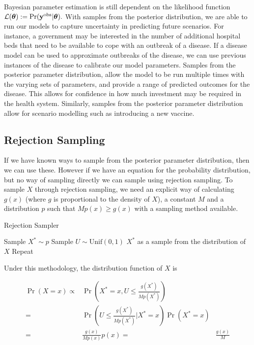 Bayesian parameter estimation is still dependent on the likelihood function
$\mathcal{L}(\bm{\theta}) := \Pr(\mathbf{y}^{\mathrm{obs}}|\bm{\theta}).$
With samples from the posterior distribution, we are
able to run our models to capture uncertainty in predicting future scenarios.
For instance, a government may be interested in the number of additional
hospital beds that need to be available to cope with an outbreak of a disease.
If a disease model can be used to approximate outbreaks of the disease,
we can use previous instances of the disease to calibrate our model parameters.
Samples from the posterior parameter distribution, allow
the model to be run multiple times with the varying sets of parameters,
and provide a range of predicted outcomes for the disease. This allows for
confidence in how much investment may be required in the health system.
Similarly, samples from the posterior parameter distribution allow for scenario
modelling such as introducing a new vaccine.

\subsection*{Rejection Sampling}

If we have known ways to sample from the posterior parameter distribution,
then we can use these. However if we have an equation for the probability
distribution, but no way of sampling directly we can sample using rejection
sampling. To sample $X$ through rejection sampling,
we need an explicit way of calculating
$g(x)$ (where $g$ is proportional to the density of $X$), a constant $M$ and
a distribution $p$ such that $Mp(x) \geq g(x)$ with a sampling method
available.

\begin{algorithm}[htbp]
    \caption{Rejection Sampler}
    \label{alg:rej_samp}
    \begin{algorithmic}
        \State Sample $X^\ast \sim p$
        \State Sample $U \sim \mathrm{Unif}(0, 1)$
        \State \Return $X^\ast$ as a sample from the distribution of $X$
        \Else
        \State Repeat
        \EndIf
    \end{algorithmic}
\end{algorithm}

Under this methodology, the distribution function of $X$ is

\begin{align*}
    \Pr(X = x)
    \propto & \Pr(X^\ast = x , U \leq \frac{g(X^\ast)}{M p(X^\ast)})
    \tag*{where the probabilities may be interpreted as densities}                   \\
    =       & \Pr(U \leq \frac{g(X^\ast)}{M p(X^\ast)} | X^\ast = x) \Pr(X^\ast = x) \\
    =       & \frac{g(x)}{M p(x)} p(x)
    =       & \frac{g(x)}{M}
\end{align*}


